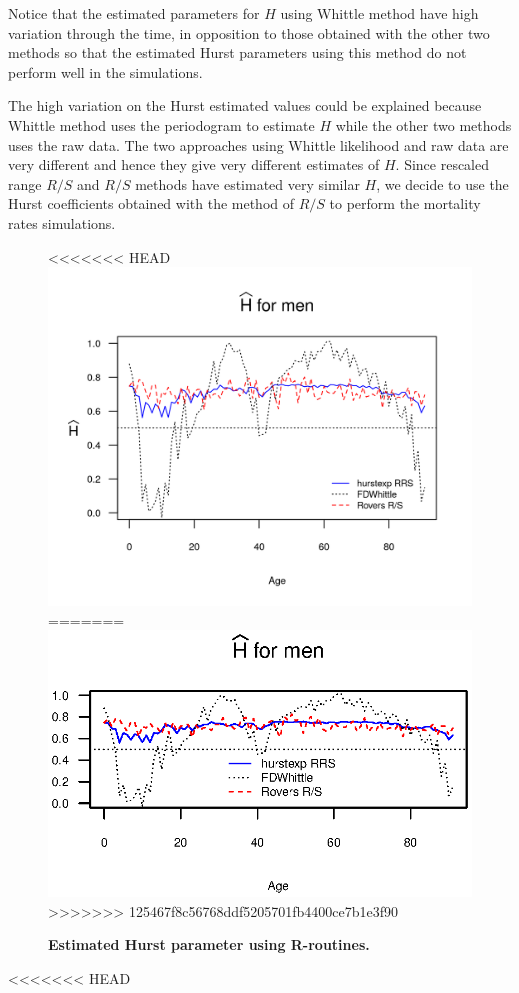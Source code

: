 \documentclass[smallextended]{svjour3}
\begin{document}
Notice that the estimated parameters for $H$ using Whittle method have high
variation through the time, in opposition to those
obtained with the other two methods so that the estimated
Hurst parameters using this method do not perform well in the simulations.

The high variation on the Hurst estimated values could be explained because
Whittle method uses
the periodogram to estimate $H$ while the other two methods uses the raw data.
The two approaches using Whittle likelihood and raw data are very different and
hence they give very different estimates of $H$. Since rescaled range $R/S$ and
$R/S$  methods have estimated very similar $H$, we decide to use the Hurst
coefficients obtained with the method of $R/S$ to perform the mortality 
rates simulations.

\begin{figure}[H]
<<<<<<< HEAD
    \includegraphics{Hurst-Men.png}
=======
    \includegraphics{Hurst-Men.eps}
>>>>>>> 125467f8c56768ddf5205701fb4400ce7b1e3f90
    \caption{\bf Estimated Hurst parameter using R-routines.}
    \label{graph-Hurst_Est_Me}
\end{figure}\vspace*{0.1cm}
<<<<<<< HEAD
\end{document}
